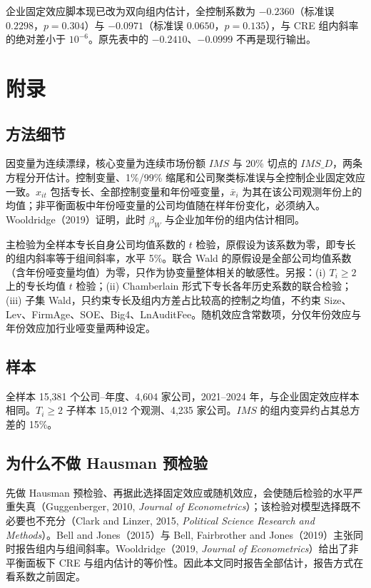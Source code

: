 \documentclass[12pt,a4paper]{article}
\begin{document}
\noindent 企业固定效应脚本现已改为双向组内估计，全控制系数为 $-0.2360$（标准误 $0.2298$，$p=0.304$）与 $-0.0971$（标准误 $0.0650$，$p=0.135$），与 CRE 组内斜率的绝对差小于 $10^{-6}$。原先表中的 $-0.2410$、$-0.0999$ 不再是现行输出。

\appendix
\section{附录}

\subsection{方法细节}

因变量为连续漂绿，核心变量为连续市场份额 $IMS$ 与 20\% 切点的 $IMS\_D$，两条方程分开估计。控制变量、1\%/99\% 缩尾和公司聚类标准误与全控制企业固定效应一致。$x_{it}$ 包括专长、全部控制变量和年份哑变量，$\bar x_i$ 为其在该公司观测年份上的均值；非平衡面板中年份哑变量的公司均值随在样年份变化，必须纳入。Wooldridge（2019）证明，此时 $\beta_W$ 与企业加年份的组内估计相同。

主检验为全样本专长自身公司均值系数的 $t$ 检验，原假设为该系数为零，即专长的组内斜率等于组间斜率，水平 5\%。联合 Wald 的原假设是全部公司均值系数（含年份哑变量均值）为零，只作为协变量整体相关的敏感性。另报：(i) $T_i\ge 2$ 上的专长均值 $t$ 检验；(ii) Chamberlain 形式下专长各年历史系数的联合检验；(iii) 子集 Wald，只约束专长及组内方差占比较高的控制之均值，不约束 Size、Lev、FirmAge、SOE、Big4、LnAuditFee。随机效应含常数项，分仅年份效应与年份效应加行业哑变量两种设定。

\subsection{样本}

全样本 15{,}381 个公司--年度、4{,}604 家公司，2021--2024 年，与企业固定效应样本相同。$T_i\ge 2$ 子样本 15{,}012 个观测、4{,}235 家公司。$IMS$ 的组内变异约占其总方差的 15\%。

\subsection{为什么不做 Hausman 预检验}

先做 Hausman 预检验、再据此选择固定效应或随机效应，会使随后检验的水平严重失真（Guggenberger, 2010, \textit{Journal of Econometrics}）；该检验对模型选择既不必要也不充分（Clark and Linzer, 2015, \textit{Political Science Research and Methods}）。Bell and Jones（2015）与 Bell, Fairbrother and Jones（2019）主张同时报告组内与组间斜率。Wooldridge（2019, \textit{Journal of Econometrics}）给出了非平衡面板下 CRE 与组内估计的等价性。因此本文同时报告全部估计，报告方式在看系数之前固定。
\end{document}
